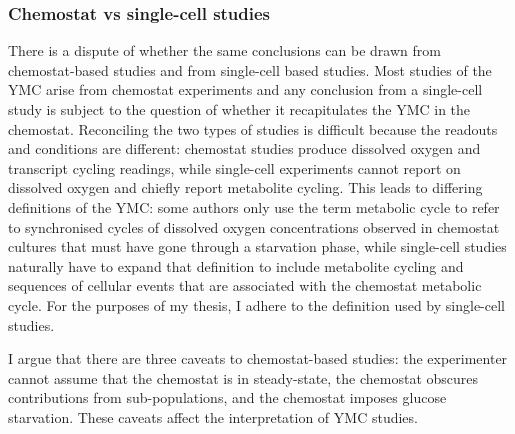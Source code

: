 
\subsubsection{Chemostat vs single-cell studies}
\label{subsubsec:intro-ymc-unresolved-chemostat_singlecell}

There is a dispute of whether the same conclusions can be drawn from chemostat-based studies and from single-cell based studies.
Most studies of the YMC arise from chemostat experiments and any conclusion from a single-cell study is subject to the question of whether it recapitulates the YMC in the chemostat.
Reconciling the two types of studies is difficult because the readouts and conditions are different:
chemostat studies produce dissolved oxygen and transcript cycling readings, while single-cell experiments cannot report on dissolved oxygen and chiefly report metabolite cycling.
This leads to differing definitions of the YMC:
some authors \parencite{laxmanBehaviorMetabolicCycling2010, caustonMetabolicRhythmsFramework2018} only use the term metabolic cycle to refer to synchronised cycles of dissolved oxygen concentrations observed in chemostat cultures that must have gone through a starvation phase, while single-cell studies \parencite{baumgartnerFlavinbasedMetabolicCycles2018, zylstraMetabolicDynamicsCell2022} naturally have to expand that definition to include metabolite cycling and sequences of cellular events that are associated with the chemostat metabolic cycle.
For the purposes of my thesis, I adhere to the definition used by single-cell studies.

I argue that there are three caveats to chemostat-based studies:
the experimenter cannot assume that the chemostat is in steady-state,
the chemostat obscures contributions from sub-populations,
and the chemostat imposes glucose starvation.
These caveats affect the interpretation of YMC studies.

